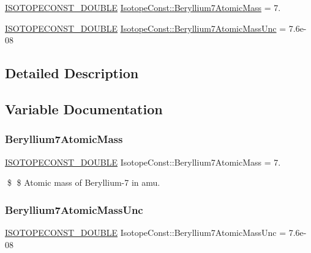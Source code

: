 \begin{DoxyCompactItemize}
\item 
\mbox{\hyperlink{group___isotope_const-_macros_ga8f45a7272ce02c0b4c65c44636ed719a}{I\+S\+O\+T\+O\+P\+E\+C\+O\+N\+S\+T\+\_\+\+D\+O\+U\+B\+LE}} \mbox{\hyperlink{group___isotope_const-_beryllium-_be7_gad369c788e28c62c413e8d02aac6d3100}{Isotope\+Const\+::\+Beryllium7\+Atomic\+Mass}} = 7.
\item 
\mbox{\hyperlink{group___isotope_const-_macros_ga8f45a7272ce02c0b4c65c44636ed719a}{I\+S\+O\+T\+O\+P\+E\+C\+O\+N\+S\+T\+\_\+\+D\+O\+U\+B\+LE}} \mbox{\hyperlink{group___isotope_const-_beryllium-_be7_ga93ad6eef6969224119c7d06cc701e397}{Isotope\+Const\+::\+Beryllium7\+Atomic\+Mass\+Unc}} = 7.\+6e-\/08
\end{DoxyCompactItemize}


\subsection{Detailed Description}


\subsection{Variable Documentation}
\mbox{\label{group___isotope_const-_beryllium-_be7_gad369c788e28c62c413e8d02aac6d3100}} 
\subsubsection{\texorpdfstring{Beryllium7\+Atomic\+Mass}{Beryllium7AtomicMass}}
{\footnotesize\ttfamily \mbox{\hyperlink{group___isotope_const-_macros_ga8f45a7272ce02c0b4c65c44636ed719a}{I\+S\+O\+T\+O\+P\+E\+C\+O\+N\+S\+T\+\_\+\+D\+O\+U\+B\+LE}} Isotope\+Const\+::\+Beryllium7\+Atomic\+Mass = 7.}

\$ \$ Atomic mass of Beryllium-\/7 in amu. \mbox{\label{group___isotope_const-_beryllium-_be7_ga93ad6eef6969224119c7d06cc701e397}} 
\subsubsection{\texorpdfstring{Beryllium7\+Atomic\+Mass\+Unc}{Beryllium7AtomicMassUnc}}
{\footnotesize\ttfamily \mbox{\hyperlink{group___isotope_const-_macros_ga8f45a7272ce02c0b4c65c44636ed719a}{I\+S\+O\+T\+O\+P\+E\+C\+O\+N\+S\+T\+\_\+\+D\+O\+U\+B\+LE}} Isotope\+Const\+::\+Beryllium7\+Atomic\+Mass\+Unc = 7.\+6e-\/08}

